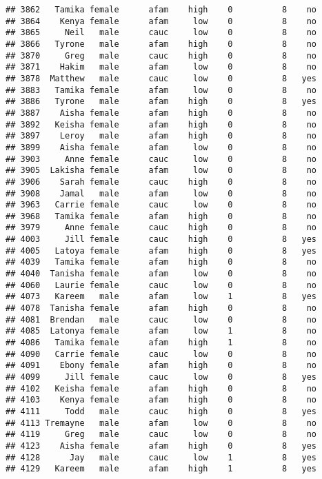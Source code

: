 \documentclass[
]{article}
\begin{document}
\begin{verbatim}
## 3862   Tamika female      afam    high    0          8    no
## 3864    Kenya female      afam     low    0          8    no
## 3865     Neil   male      cauc     low    0          8    no
## 3866   Tyrone   male      afam    high    0          8    no
## 3870     Greg   male      cauc    high    0          8    no
## 3871    Hakim   male      afam     low    0          8    no
## 3878  Matthew   male      cauc     low    0          8   yes
## 3883   Tamika female      afam     low    0          8    no
## 3886   Tyrone   male      afam    high    0          8   yes
## 3887    Aisha female      afam    high    0          8    no
## 3892   Keisha female      afam    high    0          8    no
## 3897    Leroy   male      afam    high    0          8    no
## 3899    Aisha female      afam     low    0          8    no
## 3903     Anne female      cauc     low    0          8    no
## 3905  Lakisha female      afam     low    0          8    no
## 3906    Sarah female      cauc    high    0          8    no
## 3908    Jamal   male      afam     low    0          8    no
## 3963   Carrie female      cauc     low    0          8    no
## 3968   Tamika female      afam    high    0          8    no
## 3979     Anne female      cauc    high    0          8    no
## 4003     Jill female      cauc    high    0          8   yes
## 4005   Latoya female      afam    high    0          8   yes
## 4039   Tamika female      afam    high    0          8    no
## 4040  Tanisha female      afam     low    0          8    no
## 4060   Laurie female      cauc     low    0          8    no
## 4073   Kareem   male      afam     low    1          8   yes
## 4078  Tanisha female      afam    high    0          8    no
## 4081  Brendan   male      cauc     low    0          8    no
## 4085  Latonya female      afam     low    1          8    no
## 4086   Tamika female      afam    high    1          8    no
## 4090   Carrie female      cauc     low    0          8    no
## 4091    Ebony female      afam    high    0          8    no
## 4099     Jill female      cauc     low    0          8   yes
## 4102   Keisha female      afam    high    0          8    no
## 4103    Kenya female      afam    high    0          8    no
## 4111     Todd   male      cauc    high    0          8   yes
## 4113 Tremayne   male      afam     low    0          8    no
## 4119     Greg   male      cauc     low    0          8    no
## 4123    Aisha female      afam    high    0          8   yes
## 4128      Jay   male      cauc     low    1          8   yes
## 4129   Kareem   male      afam    high    1          8   yes

\end{verbatim}
\end{document}
